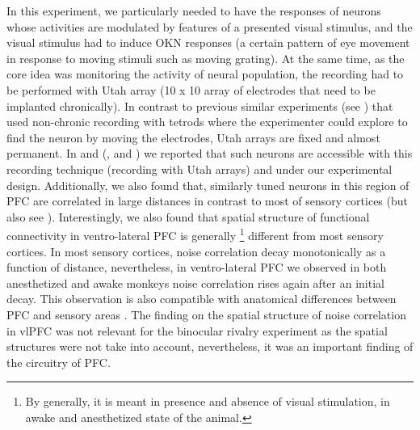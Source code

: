 In this experiment, we particularly  needed to have the responses of neurons whose activities are modulated by features of a presented visual stimulus, 
and the visual stimulus had to induce OKN responses
(a certain pattern of eye movement in response to moving stimuli such as moving grating).
At the same time, as the core idea was monitoring the activity of neural population,
the recording had to be performed with Utah array 
(10 x 10 array of electrodes that need to be implanted chronically).
In contrast to previous similar experiments (\eg see \citet{panagiotaropoulosNeuronalDischargesGamma2012}) that used non-chronic recording with tetrods where the experimenter could explore to find the neuron by moving the electrodes,
Utah arrays are fixed and almost permanent.
In \citet{safaviNonmonotonicSpatialStructure2018} and \citet{kapoorDecodingInternallyGenerated2022}
(\seealsos,  and )
we reported that such neurons are accessible with this recording technique (recording with Utah arrays) and under our experimental design.
Additionally, we also found that, similarly tuned neurons in this region of PFC
are correlated in large distances \cite{safaviNonmonotonicSpatialStructure2018} in contrast to most of sensory cortices
\cite{rothschildFunctionalOrganizationPopulation2010,cohenMeasuringInterpretingNeuronal2011,smithSpatialTemporalScales2008a,smithSpatialTemporalScales2013a,denmanStructurePairwiseCorrelation2014} (but also see \cite{rosenbaumSpatialStructureCorrelated2017}).
Interestingly, we also found that spatial structure of functional connectivity in ventro-lateral PFC is generally
\footnote{By generally, it is meant in presence and absence of visual stimulation, in awake and anesthetized state of the animal.}
different from  most sensory cortices.
In most  sensory cortices, noise correlation decay monotonically as a function of distance,
nevertheless, in ventro-lateral PFC we observed in both anesthetized and awake monkeys noise correlation rises again after an initial decay.
This observation is also compatible with anatomical differences between PFC and sensory areas
\cite{levittTopographyPyramidalNeuron1993,amirCorticalHierarchyReflected1993,lundComparisonIntrinsicConnectivity1993,kritzerIntrinsicCircuitOrganization1995,fujitaIntrinsicConnectionsMacaque1996,tanigawaOrganizationHorizontalAxons2005}.
The finding on the spatial structure of noise correlation in vlPFC was not relevant for the binocular rivalry experiment as the spatial structures were not take into account,
nevertheless, it was an important finding of the circuitry of PFC.

